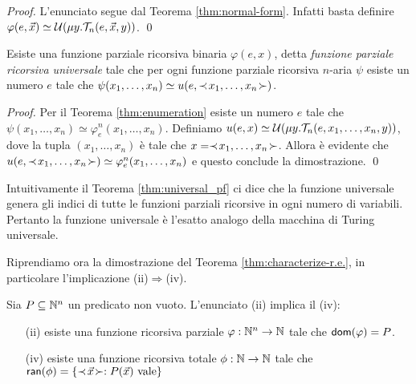 \documentclass[runningheads,a4paper]{llncs}
\begin{document}
\begin{proof}
L'enunciato segue dal Teorema \ref{thm:normal-form}. Infatti basta definire $\varphi(e,\vec x) \simeq \mathcal{U}(\mu y.\mathcal{T}_n(e,\vec x,y))$.
\qed\end{proof}

\begin{theorem}\label{thm:universal_pf}
Esiste una funzione parziale ricorsiva binaria $\varphi(e,x)$, detta \emph{funzione parziale ricorsiva universale} tale che per ogni
 funzione parziale ricorsiva $n$-aria $\psi$ esiste un numero $e$ tale che $\psi(x_1,\ldots,x_n) \simeq u(e,\prec\! x_1,\ldots,x_n \!\succ)$.
\end{theorem}

\begin{proof}
Per il Teorema \ref{thm:enumeration} esiste un numero $e$ tale che $\psi(x_1,\ldots,x_n) \simeq \varphi_e^n(x_1,\ldots,x_n)$.
Definiamo $u(e,x) \simeq \mathcal{U}(\mu y.\mathcal{T}_n(e,x_1,\ldots,x_n,y))$, dove la tupla $(x_1,\ldots,x_n)$ \`{e} tale che
 $x = \prec\! x_1,\ldots,x_n \!\succ$. Allora \`{e} evidente che $u(e,\prec\! x_1,\ldots,x_n \!\succ)\simeq \varphi_e^n(x_1,\ldots,x_n)$ e questo conclude
 la dimostrazione.
\qed\end{proof}

Intuitivamente il Teorema \ref{thm:universal_pf} ci dice che la funzione universale genera gli indici di tutte le funzioni parziali ricorsive
 in ogni numero di variabili. Pertanto la funzione universale \`{e} l'esatto analogo della macchina di Turing universale.

\bigskip

Riprendiamo ora la dimostrazione del Teorema \ref{thm:characterize-r.e.}, in particolare l'implicazione (ii)$\Rightarrow$(iv).

\begin{theorem}
Sia $P \subseteq \mathbb{N}^n$ un predicato non vuoto. L'enunciato (ii) implica il (iv):
\begin{itemize}
\item[(ii)] esiste una funzione ricorsiva parziale $\varphi: \mathbb{N}^n \to \mathbb{N}$ tale che $\mathsf{dom}(\varphi) = P$.
\item[(iv)] esiste una funzione ricorsiva totale $\phi: \mathbb{N} \to \mathbb{N}$ tale che\\ $\mathsf{ran}(\phi) = \{\prec\! \vec x \!\succ : P(\vec x) \mbox{ vale} \}$
\end{itemize}
\end{theorem}
\end{document}
